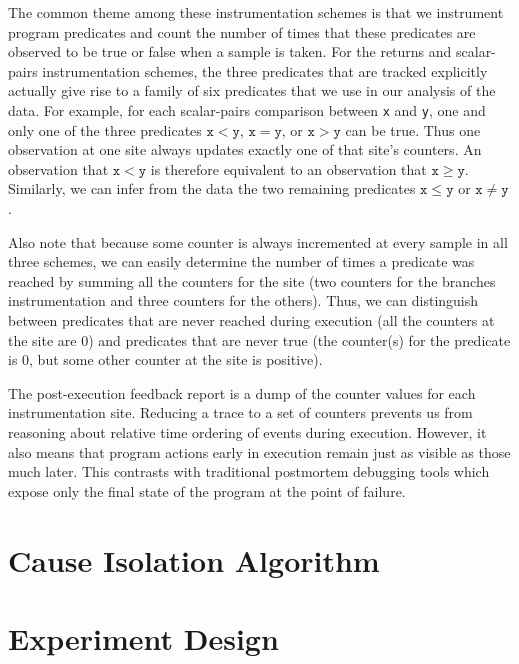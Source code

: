\documentclass{sig-alternate}
\begin{document}
The common theme among these instrumentation schemes is that we
instrument program predicates and count the number of times that these
predicates are observed to be true or false when a sample is taken.
For the returns and scalar-pairs instrumentation schemes, the three
predicates that are tracked explicitly actually give rise to a family
of six predicates that we use in our analysis of the data.
For example, for each scalar-pairs comparison between \texttt{x} and \texttt{y}, one and
only one of the three predicates $\mathtt{x} < \mathtt{y}$, $\mathtt{x} = \mathtt{y}$, or
$\mathtt{x} > \mathtt{y}$ can be true.  Thus one observation at one
site always updates exactly one of that site's counters.  An
observation that $\mathtt{x} < \mathtt{y}$ is therefore equivalent to
an observation that $\mathtt{x} \geq \mathtt{y}$.  Similarly, we can
infer from the data the two remaining predicates $\mathtt{x} \leq \mathtt{y}$ or
$\mathtt{x} \neq \mathtt{y}$.

Also note that because some counter is always incremented at every
sample in all three schemes, we can easily determine the number of
times a predicate was reached by summing all the counters for the site
(two counters for the branches instrumentation and three counters for
the others).  Thus, we can distinguish between predicates that are
never reached during execution (all the counters at the site are 0)
and predicates that are never true (the counter(s) for the predicate
is 0, but some other counter at the site is positive).

The post-execution feedback report is a dump of the counter values for
each instrumentation site.  Reducing a trace to a set of counters
prevents us from reasoning about relative time ordering of events
during execution.  However, it also means that program actions early
in execution remain just as visible as those much later.  This
contrasts with traditional postmortem debugging tools which expose
only the final state of the program at the point of failure.

\section{Cause Isolation Algorithm}
\label{sec:algorithm}


\section{Experiment Design}
\label{sec:experiments:setup}

\end{document}
